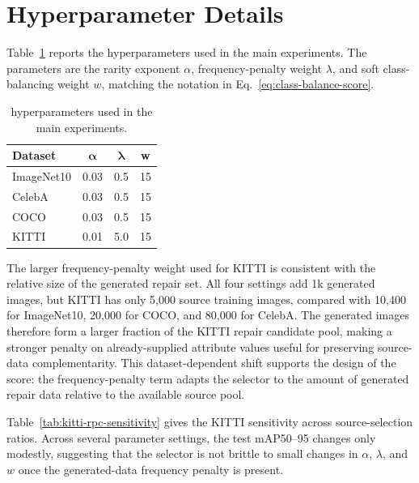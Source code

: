 \section{Hyperparameter Details}
\label{app:hyperparameter-details}
Table~\ref{tab:rpc-hyperparameters} reports the \model hyperparameters used in the main experiments. The parameters are the rarity exponent $\alpha$, frequency-penalty weight $\lambda$, and soft class-balancing weight $w$, matching the notation in Eq.~\ref{eq:class-balance-score}.

\begin{table}[htbp]
\centering
\caption{\model hyperparameters used in the main experiments.}
\label{tab:rpc-hyperparameters}
\small
\setlength{\tabcolsep}{5pt}
\begin{tabular}{l c c c}
\toprule
\rowcolor{sectiongray} \textbf{Dataset} & $\boldsymbol{\alpha}$ & $\boldsymbol{\lambda}$ & \textbf{w} \\
\midrule
ImageNet10 & 0.03 & 0.5 & 15 \\
CelebA & 0.03 & 0.5 & 15 \\
COCO & 0.03 & 0.5 & 15 \\
KITTI & 0.01 & 5.0 & 15 \\
\bottomrule
\end{tabular}
\end{table}

The larger frequency-penalty weight used for KITTI is consistent with the relative size of the generated repair set. All four settings add 1k generated images, but KITTI has only 5,000 source training images, compared with 10,400 for ImageNet10, 20,000 for COCO, and 80,000 for CelebA. The generated images therefore form a larger fraction of the KITTI repair candidate pool, making a stronger penalty on already-supplied attribute values useful for preserving source-data complementarity. This dataset-dependent shift supports the design of the score: the frequency-penalty term adapts the selector to the amount of generated repair data relative to the available source pool.

Table~\ref{tab:kitti-rpc-sensitivity} gives the KITTI sensitivity across source-selection ratios. Across several \model parameter settings, the test mAP50--95 changes only modestly, suggesting that the selector is not brittle to small changes in $\alpha$, $\lambda$, and $w$ once the generated-data frequency penalty is present.

